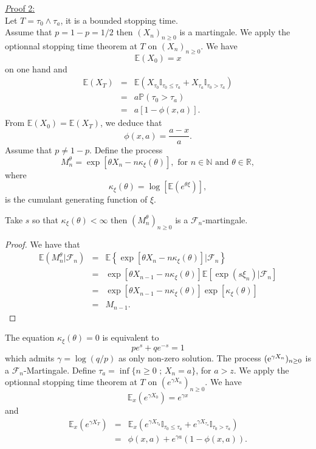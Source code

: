 \underline{\textit Proof 2:}\\
Let $T = \tau_0\land\tau_a$, it is a bounded stopping time.\\

Assume that $p=1- p =1/2$ then $(X_n)_{n\geq 0}$ is a martingale. We apply the optionnal stopping time theorem at $T$ on $(X_n)_{n\geq 0}$. We have 
$$
\mathbb{E}(X_0) = x
$$
on one hand and 
\begin{eqnarray*}
\mathbb{E}(X_T)&=&\mathbb{E}(X_{\tau_0}\mathbb{I}_{\tau_0\leq \tau_a} + X_{\tau_a}\mathbb{I}_{\tau_0> \tau_a})\\
&=&a\mathbb{P}(\tau_0>\tau_a)\\
&=&a\left[1-\phi(x,a)\right].
\end{eqnarray*}
From $\mathbb{E}(X_0) =\mathbb{E}(X_T)$, we deduce that 
$$
\phi(x,a) = \frac{a-x}{a}.
$$
Assume that $p\neq 1-p $. Define the process 
$$
M_n^\theta = \exp\left[\theta X_n- n\kappa_\xi(\theta)\right],\text{ for }n\in\mathbb{N}\text{ and }\theta\in\mathbb{R}, 
$$
where
$$
\kappa_\xi(\theta) = \log\left[\mathbb{E}\left(e^{\theta\xi}\right)\right],
$$
is the cumulant generating function of $\xi$. 
\begin{lemma}\label{lem:wald_martingale_RW}
Take $s$ so that $\kappa_\xi(\theta)<\infty$ then $(M_n^\theta)_{n\geq0}$ is a $\mathcal{F}_n$-martingale.
\end{lemma}
\begin{proof}
We have that 
\begin{eqnarray*}
\mathbb{E}(M_n^\theta|\mathcal{F}_n)&=&\mathbb{E}\left\{\exp\left[\theta X_n - n\kappa_\xi(\theta)\right]|\mathcal{F}_n\right\}\\
&=&\exp\left[\theta X_{n-1} - n\kappa_\xi(\theta)\right]\mathbb{E}\left[\exp\left(s\xi_{n}\right)|\mathcal{F}_n\right]\\
&=&\exp\left[\theta X_{n-1}- n\kappa_\xi(\theta) \right]\exp[ \kappa_\xi(\theta) ]\\
&=& M_{n-1}.
\end{eqnarray*}
\end{proof} 
The equation $\kappa_\xi(\theta) = 0$ is equivalent to 
$$
pe^s+qe^{-s} = 1
$$
which admits $\gamma =\log(q/p)$ as only non-zero solution. The process $(\mathrm{e}^{\gamma X_n})_{n\geq0}$ is a $\mathcal{F}_n$-Martingale. Define $\tau_a = \inf\{n\geq 0\text{ ; }X_n = a\}$, for $a>z$. We apply the optionnal stopping time theorem at $T$ on $\left(e^{\gamma X_n}\right)_{n\geq 0}$. We have
$$
\mathbb{E}_x(e^{\gamma X_0}) = e^{\gamma x}
$$
and 
\begin{eqnarray*}
 \mathbb{E}_x(e^{\gamma X_{T}}) &=& \mathbb{E}_x(e^{\gamma X_{\tau_0}}\mathbb{I}_{\tau_0\leq \tau_a} + e^{\gamma X_{\tau_a}}\mathbb{I}_{\tau_0> \tau_a})\\
 &=& \phi(x,a) + e^{\gamma a}(1-\phi(x,a)).
\end{eqnarray*}
